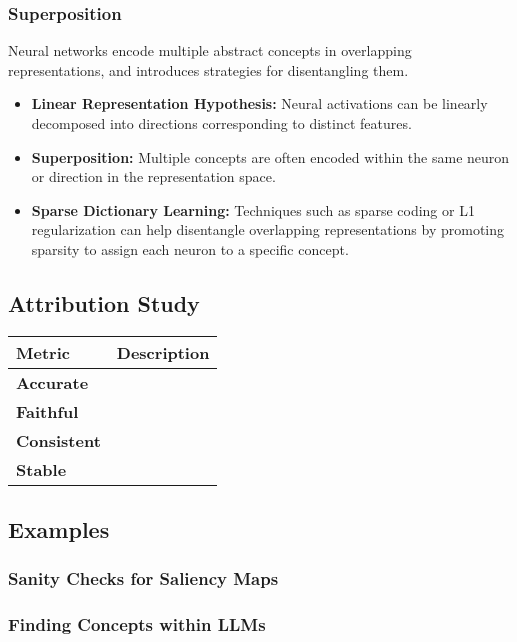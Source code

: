 \subsubsection{Superposition}
\begin{notes} Neural networks encode multiple abstract concepts in overlapping representations, and introduces strategies for disentangling them.
    \begin{itemize}
        \item \textbf{Linear Representation Hypothesis:} Neural activations can be linearly decomposed into directions corresponding to distinct features. 
        \item \textbf{Superposition:} Multiple concepts are often encoded within the same neuron or direction in the representation space.
        \item \textbf{Sparse Dictionary Learning:} Techniques such as sparse coding or L1 regularization can help disentangle overlapping representations by promoting sparsity to assign each neuron to a specific concept.
    \end{itemize}    
\end{notes}
\newpage

\subsection{Attribution Study}
\begin{summary}
    \begin{center}
        \begin{tabular}{ll}
            \toprule
            \textbf{Metric} & \textbf{Description} \\
            \midrule
            \textbf{Accurate} & \\
            \midrule
            \textbf{Faithful} & \\
            \midrule
            \textbf{Consistent} & \\
            \midrule
            \textbf{Stable} & \\
        \end{tabular}
    \end{center}    
\end{summary}

\begin{summary}
\end{summary}

\subsection{Examples}
\subsubsection{Sanity Checks for Saliency Maps}
\begin{example}
    
\end{example}

\subsubsection{Finding Concepts within LLMs}
\begin{example}
    
\end{example}
